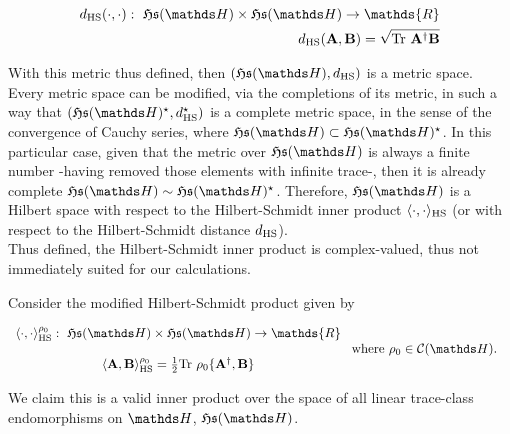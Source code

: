 \documentclass{homework}
\begin{document}
\begin{equation*}
\begin{split}
   d_{\textnormal{HS}}(\cdot, \cdot): \blanky \mathfrak{H}\mathfrak{s}(\hilbert) \times \mathfrak{H}\mathfrak{s}(\hilbert) \rightarrow \mathds{R} \\
   d_{\textnormal{HS}}({\bf A}, {\bf B}) = \sqrt{\textnormal{Tr } {\bf A}^\dagger {\bf B}}
\end{split}
\end{equation*}

With this metric thus defined, then $(\mathfrak{H}\mathfrak{s}(\hilbert), d_{\textnormal{HS}})$ is a metric space. Every metric space can be modified, via the completions of its metric, in such a way that 
$(\mathfrak{H}\mathfrak{s}(\hilbert)^{\star}, d_{\textnormal{HS}}^{\star})$ is a complete metric space, in the sense of the convergence of Cauchy series, where $\mathfrak{H}\mathfrak{s}(\hilbert) \subset \mathfrak{H}\mathfrak{s}(\hilbert)^{\star}$. In this particular case, given that the metric over $\mathfrak{H}\mathfrak{s}(\hilbert)$ is always a finite number -having removed those elements with infinite trace-, then it is already complete $\mathfrak{H}\mathfrak{s}(\hilbert) \sim \mathfrak{H}\mathfrak{s}(\hilbert)^{\star}$. Therefore, $\mathfrak{H}\mathfrak{s}(\hilbert)$ is a Hilbert space with respect to the Hilbert-Schmidt inner product $\langle \cdot , \cdot \rangle_{\textnormal{HS}}$ (or with respect to the Hilbert-Schmidt distance $d_{\textnormal{HS}}$). \\

Thus defined, the Hilbert-Schmidt inner product is complex-valued, thus not immediately suited for our calculations.

\begin{theo}
Consider the modified Hilbert-Schmidt product given by 
 
 \begin{align*}
 \begin{array}{c}
    \langle \cdot , \cdot \rangle_{\textnormal{HS}}^{\rho_0}: \blanky \mathfrak{H}\mathfrak{s}(\hilbert) \times \mathfrak{H}\mathfrak{s}(\hilbert) \rightarrow \mathds{R} \\
    \\
    \langle {\bf A}, {\bf B} \rangle_{\textnormal{HS}}^{\rho_0} = \frac{1}{2}\textnormal{Tr } \rho_0 \bf \{A^\dagger, {\bf B}\}
 \end{array} & \textnormal{ where } \rho_0 \in \statespace.
\end{align*}

We claim this is a valid inner product over the space of all linear trace-class endomorphisms on $\hilbert$, $\mathfrak{H}\mathfrak{s}(\hilbert)$.
\end{theo}
\end{document}
